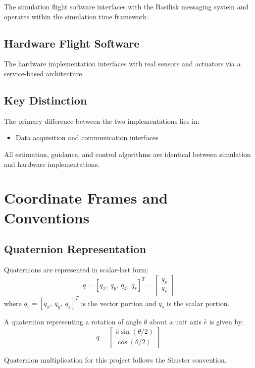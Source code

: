 The simulation flight software interfaces with the Basilisk messaging system and operates within the simulation time framework.

\subsection{Hardware Flight Software}

The hardware implementation interfaces with real sensors and actuators via a service-based architecture.

\subsection{Key Distinction}

The primary difference between the two implementations lies in:

\begin{itemize}
	\item Data acquisition and communication interfaces
\end{itemize}

All estimation, guidance, and control algorithms are identical between simulation and hardware implementations.


\section{Coordinate Frames and Conventions}

\subsection{Quaternion Representation}

Quaternions are represented in scalar-last form:
\[
q = [q_x,\ q_y,\ q_z,\ q_s]^T
=
\begin{bmatrix}
	q_v \\
	q_s
\end{bmatrix}
\]
where \(q_v = [q_x,\ q_y,\ q_z]^T\) is the vector portion and \(q_s\) is the scalar portion.

A quaternion representing a rotation of angle \(\theta\) about a unit axis \(\hat{e}\) is given by:
\[
q =
\begin{bmatrix}
	\hat{e}\sin(\theta/2) \\
	\cos(\theta/2)
\end{bmatrix}
\]

Quaternion multiplication for this project follows the Shuster convention.

